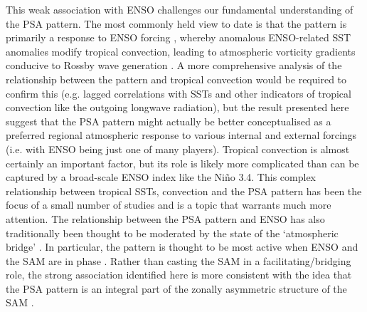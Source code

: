 This weak association with ENSO challenges our fundamental understanding of the PSA pattern. The most commonly held view to date is that the pattern is primarily a response to ENSO forcing \citep[e.g.][]{Mo2001}, whereby anomalous ENSO-related SST anomalies modify tropical convection, leading to atmospheric vorticity gradients conducive to Rossby wave generation \citep{Sardeshmukh1988}. A more comprehensive analysis of the relationship between the pattern and tropical convection would be required to confirm this (e.g. lagged correlations with SSTs and other indicators of tropical convection like the outgoing longwave radiation), but the result presented here suggest that the PSA pattern might actually be better conceptualised as a preferred regional atmospheric response to various internal and external forcings (i.e. with ENSO being just one of many players). Tropical convection is almost certainly an important factor, but its role is likely more complicated than can be captured by a broad-scale ENSO index like the Ni\~{n}o 3.4. This complex relationship between tropical SSTs, convection and the PSA pattern has been the focus of a small number of studies \citep[e.g.][]{Harangozo2004,LachlanCope2006} and is a topic that warrants much more attention. The relationship between the PSA pattern and ENSO has also traditionally been thought to be moderated by the state of the `atmospheric bridge' \citep{Liu2007}. In particular, the pattern is thought to be most active when ENSO and the SAM are in phase \citep{Fogt2006}. Rather than casting the SAM in a facilitating/bridging role, the strong association identified here is more consistent with the idea that the PSA pattern is an integral part of the zonally asymmetric structure of the SAM \citep[e.g.][]{Ding2012,Fogt2012}. 
